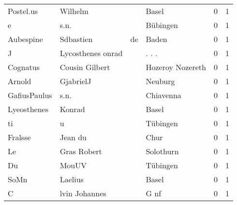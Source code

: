 \begin{center}
\begin{tiny}
\begin{longtabu}{llllrr}
                Postel.us &                            Wilhelm &             &                                       Basel &          0 &         1 \\
                        e &                               s.n. &             &                                    Bübingen &          0 &         1 \\
                Aubespine &                          Sdbastien &          de &                                       Baden &          0 &         1 \\
                        J &                  Lycosthenes onrad &             &                                      . . .  &          0 &         1 \\
                 Cognatus &                     Cousin Gilbert &             &                            Hozeroy Nozereth &          0 &         1 \\
                   Arnold &                          GjabrielJ &             &                                     Neuburg &          0 &         1 \\
             GafiusPaulus &                               s.n. &             &                                   Chiavenna &          0 &         1 \\
              Lyeosthenes &                             Konrad &             &                                       Basel &          0 &         1 \\
                       ti &                                  u &             &                                    Tübingen &          0 &         1 \\
                  Fralsse &                            Jean du &             &                                        Chur &          0 &         1 \\
                       Le &                        Gras Robert &             &                                   Solothurn &          0 &         1 \\
                       Du &                              MouUV &             &                                    Tübingen &          0 &         1 \\
                     SoMn &                            Laelius &             &                                       Basel &          0 &         1 \\
                        C &                      lvin Johannes &             &                                        G nf &          0 &         1 \\

\end{longtabu}
\end{tiny}
\end{center}
